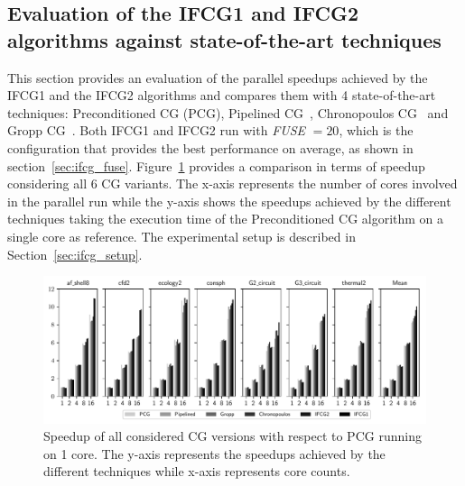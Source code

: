 \subsection{Evaluation of the IFCG1 and IFCG2 algorithms against state-of-the-art techniques}
\label{sec:ifcg_alg_comp}
This section provides an evaluation of the parallel speedups achieved by the IFCG1 and the IFCG2 algorithms 
and compares them with 4 state-of-the-art techniques: Preconditioned CG (PCG), Pipelined CG~\cite{ghysels14}, Chronopoulos CG~\cite{chronopoulos89} and Gropp CG~\cite{gropp10}.
Both IFCG1 and IFCG2 run with \emph{FUSE} $=20$, which is the configuration that provides the best performance on average, as shown in section~\ref{sec:ifcg_fuse}.
Figure~\ref{comp} provides a comparison in terms of speedup considering all 6 CG variants.
The x-axis represents the number of cores involved in the parallel run while the y-axis shows the speedups achieved by the different techniques taking the execution time of the Preconditioned CG algorithm on a single core as reference.
The experimental setup is described in Section~\ref{sec:ifcg_setup}.

\begin{figure}[bhtp]
	\centerline{\includegraphics[width=\textwidth, trim={0.0cm 0 0.0cm 0},clip]{ifcg/figs/mn3_comp/cg_speedup_bar2.pdf}}
	\caption{Speedup of all considered CG versions with respect to PCG running on 1 core. The y-axis represents the speedups achieved by the different techniques while x-axis represents core counts.}
	\label{comp}
\end{figure}

